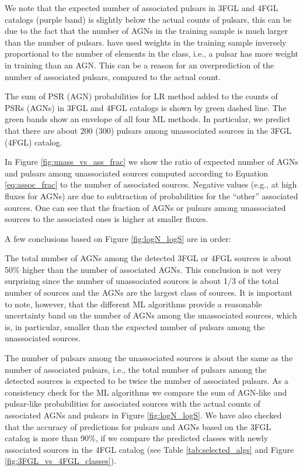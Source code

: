 We note that the expected number of associated pulsars in 3FGL and 4FGL catalogs (purple band) is slightly below the 
actual counts of pulsars, this can be due to the fact that the number of AGNs in the training sample is much larger than the number of pulsars.
\cite{2016ApJ...820....8S} have used weights in the training sample inversely proportional to the number of elements in the class,
i.e., a pulsar has more weight in training than an AGN.
This can be a reason for an overprediction of the number of associated pulsars, compared to the actual count.


The sum of PSR (AGN) probabilities for LR method
added to the counts of PSRs (AGNs) in 3FGL and 4FGL catalogs is shown by green dashed line.
The green bands show an envelope of all four ML methods.
In particular, we predict that there are about 200 (300) pulsars among unassociated sources in the 3FGL (4FGL) catalog.




In Figure \ref{fig:unass_vs_ass_frac} we show the ratio of expected number of AGNs and pulsars among unassociated sources computed according to Equation \ref{eq:assoc_frac} to the number of associated sources.
Negative values (e.g., at high fluxes for AGNs) are due to subtraction of probabilities for the ``other'' associated sources.
One can see that the fraction of AGNs or pulsars among unassociated sources to the associated ones is higher at smaller fluxes.

A few conclusions based on Figure \ref{fig:logN_logS} are in order:
\ben
\item
The total number of AGNs among the detected 3FGL or 4FGL sources is about 50\% higher than the number of associated AGNs.
This conclusion is not very surprising since the number of unassociated sources is about 1/3 of the total number of sources and the 
AGNs are the largest class of sources. It is important to note, however, that the different ML algorithms provide a reasonable uncertainty band on the number of AGNs among the unassociated sources, which is, in particular, smaller than the expected number of pulsars among the unassociated sources.
\item
The number of pulsars among the unassociated sources is about the same as the number of associated pulsars, i.e., the total number of pulsars among the detected sources is expected to be twice the number of associated pulsars.
\een
As a consistency check for the ML algorithms we compare the sum of AGN-like and pulsar-like probabilities for associated sources with the actual counts of associated AGNs and pulsars in Figure \ref{fig:logN_logS}. We have also checked that the accuracy of predictions for pulsars and AGNs based on the 3FGL catalog is more than 90\%, if we compare the predicted classes with newly associated sources in the 4FGL catalog (see Table \ref{tab:selected_algs} and Figure \ref{fig:3FGL_vs_4FGL_classes}).





